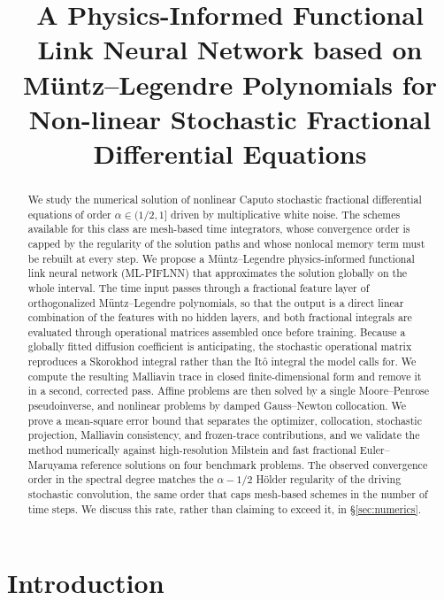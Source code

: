 \documentclass[11pt, a4paper]{article}
\title{A Physics-Informed Functional Link Neural Network based on M\"untz--Legendre Polynomials for Non-linear Stochastic Fractional Differential Equations}
\date{}
\author{}
\theoremstyle{theoremstyle}
\theoremstyle{definitionstyle}
\begin{document}
\maketitle

\begin{abstract}
We study the numerical solution of nonlinear Caputo stochastic fractional
differential equations of order $\alpha\in(1/2,1]$ driven by multiplicative
white noise. The schemes available for this class are mesh-based time
integrators, whose convergence order is capped by the regularity of the
solution paths and whose nonlocal memory term must be rebuilt at every step.
We propose a M\"untz--Legendre physics-informed functional link neural network
(ML-PIFLNN) that approximates the solution globally on the whole interval.
The time input passes through a fractional feature layer of orthogonalized
M\"untz--Legendre polynomials, so that the output is a direct linear
combination of the features with no hidden layers, and both fractional
integrals are evaluated through operational matrices assembled once before
training. Because a globally fitted diffusion coefficient is anticipating,
the stochastic operational matrix reproduces a Skorokhod integral rather than
the It\^o integral the model calls for. We compute the resulting Malliavin
trace in closed finite-dimensional form and remove it in a second, corrected
pass. Affine problems are then solved by a single Moore--Penrose pseudoinverse,
and nonlinear problems by damped Gauss--Newton collocation. We prove a
mean-square error bound that separates the optimizer, collocation, stochastic
projection, Malliavin consistency, and frozen-trace contributions, and we
validate the method numerically against high-resolution Milstein and fast
fractional Euler--Maruyama reference solutions on four benchmark problems. The
observed convergence order in the spectral degree matches the
$\alpha-1/2$ Hölder regularity of the driving stochastic convolution,
the same order that caps mesh-based schemes in the number of time steps. We
discuss this rate, rather than claiming to exceed it, in
\S\ref{sec:numerics}.
\end{abstract}

\section{Introduction}
\end{document}
